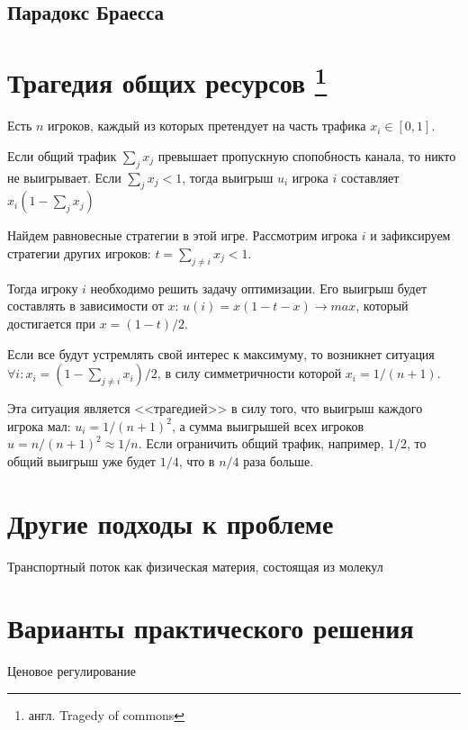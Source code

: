 \subsection{Парадокс Браесса}\cite[65]{gas}

\section{Трагедия общих ресурсов \footnote{англ. Tragedy of commons}}

Есть $n$ игроков, каждый из которых претендует на часть трафика $x_i\in[0,1]$.

Если общий трафик $\sum_j x_j$ превышает пропускную спопобность канала, то никто не выигрывает.
Если
$\sum_j x_j < 1$,
тогда выигрыш $u_i$ игрока 
$i$ составляет $x_i(1-\sum_j x_j)$

Найдем равновесные стратегии в этой игре.
Рассмотрим игрока $i$ и зафиксируем стратегии других игроков: $t=\sum_{j\ne i} x_j<1$.

Тогда игроку $i$ необходимо решить задачу оптимизации. 
Его выигрыш будет составлять в зависимости от $x$:
$u(i)=x(1-t-x)\to max$, который достигается при $x=(1-t)/2$.

Если все будут устремлять свой интерес к максимуму, то возникнет ситуация $\forall i: x_i=(1-\sum_{j\ne i} x_i)/2$, в силу симметричности которой $x_i=1/(n+1)$.

Эта ситуация является <<трагедией>> в силу того, что выигрыш каждого игрока мал: $u_i=1/(n+1)^2$, а сумма выигрышей всех игроков $u=n/(n+1)^2\approx 1/n$. Если ограничить общий трафик, например, $1/2$, то общий выигрыш уже будет $1/4$, что в $n/4$ раза больше\cite[5]{agt2007}.



\section{Другие подходы к проблеме}
Транспортный поток как физическая материя, состоящая из молекул \cite[168]{lukanin}
\section{Варианты практического решения}
Ценовое регулирование




